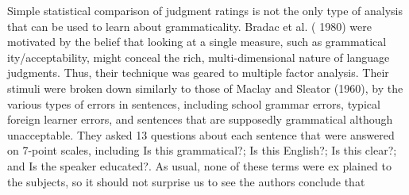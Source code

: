 \begin{styleTextbody}
Simple statistical comparison of judgment ratings is not the only type of analysis that can be used to learn about grammaticality. Bradac et al. ( 1980) were motivated by the belief that looking at a single measure, such as grammatical\- ity/acceptability, might conceal the {\textquotedbl}rich, multi-dimensional nature of language judgments.{\textquotedbl} Thus, their technique was geared to multiple factor analysis. Their stimuli were broken down similarly to those of Maclay and Sleator (1960), by the various types of errors in sentences, including {\textquotedbl}school grammar{\textquotedbl} errors, typical foreign learner errors, and sentences that are supposedly grammatical although unacceptable. They asked 13 questions about each sentence that were answered on 7-point scales, including {\textquotedbl}Is this grammatical?{\textquotedbl}; {\textquotedbl}Is this English?{\textquotedbl}; {\textquotedbl}Is this clear?{\textquotedbl}; and {\textquotedbl}Is the speaker educated?{\textquotedbl}. As usual, none of these terms were ex\- plained to the subjects, so it should not surprise us to see the authors conclude that
\end{styleTextbody}


